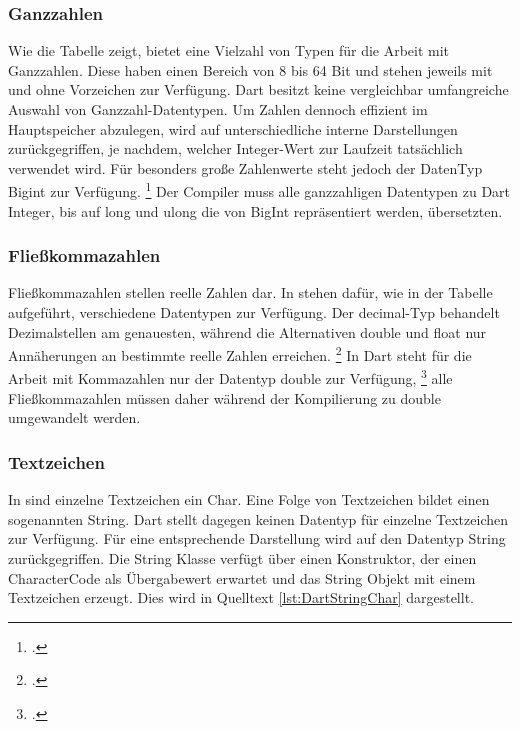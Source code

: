 \subsubsection{Ganzzahlen}
Wie die Tabelle zeigt,  bietet \Csharp{} eine Vielzahl von Typen für die Arbeit mit Ganzzahlen.  Diese haben einen Bereich von 8 bis 64 Bit und stehen jeweils mit und ohne Vorzeichen zur Verfügung.  Dart besitzt keine vergleichbar umfangreiche Auswahl von Ganzzahl-Datentypen.  Um Zahlen dennoch effizient im Hauptspeicher abzulegen, wird auf unterschiedliche interne Darstellungen zurückgegriffen, je nachdem,  welcher Integer-Wert zur Laufzeit tatsächlich verwendet wird.  Für besonders große Zahlenwerte steht jedoch der DatenTyp \glq Bigint\grq{}  zur Verfügung.  \footcite[Vgl. ][Abgerufen am \today]{Ford2019} Der Compiler muss alle ganzzahligen  \Csharp{} Datentypen zu Dart \glq Integer\grq,  bis auf \glq long\grq{} und \glq ulong\grq{} die von \glq BigInt\grq{}  repräsentiert werden, übersetzten. 

\subsubsection{Fließkommazahlen}


Fließkommazahlen stellen reelle Zahlen dar.  In \Csharp{} stehen dafür, wie in der Tabelle aufgeführt,  verschiedene Datentypen zur Verfügung.  Der \glq decimal\grq -Typ behandelt Dezimalstellen am genauesten,  während die Alternativen \glq double\grq{} und  \glq float\grq{} nur Annäherungen an bestimmte reelle Zahlen erreichen.  \footcite[Vgl. ][Abgerufen am \today]{MicrosoftFlieskomma2021}
In Dart steht für die Arbeit mit Kommazahlen nur der Datentyp \glq  double\grq{} zur Verfügung, \footcite[Vgl. ][Abgerufen am \today]{GoogleDouble} alle Fließkommazahlen müssen daher während der Kompilierung zu \glq double\grq{} umgewandelt werden.

\subsubsection{Textzeichen}

In \Csharp{} sind einzelne Textzeichen ein \glq  Char\grq .  Eine Folge von Textzeichen bildet einen  sogenannten \glq  String\grq.  Dart stellt dagegen keinen Datentyp für einzelne Textzeichen zur Verfügung.  Für eine entsprechende Darstellung wird auf den Datentyp \glq  String\grq{} zurückgegriffen.  Die  \glq String\grq{} Klasse verfügt über einen Konstruktor, der einen \glq CharacterCode\grq{} als Übergabewert erwartet und das String Objekt mit einem  Textzeichen erzeugt. Dies wird in Quelltext \ref{lst:DartStringChar} dargestellt.



